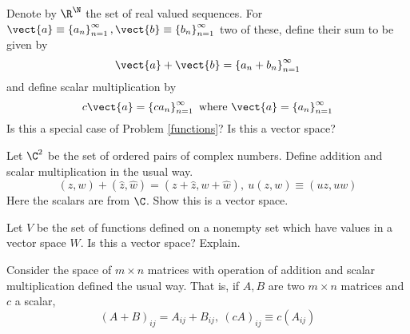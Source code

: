 \begin{enumialphparenastyle}
\begin{ex} Denote by $\R^{\N}$ the set of real valued sequences.
For $\vect{a}\equiv \left\{ a_{n}\right\} _{n=1}^{\infty },\vect{b}\equiv
\left\{ b_{n}\right\} _{n=1}^{\infty }$ two of these, define their sum to be
given by 
\begin{equation*}
\vect{a}+\vect{b} =  \left\{ a_{n}+b_{n}\right\} _{n=1}^{\infty }
\end{equation*}
and define scalar multiplication by 
\begin{equation*}
c\vect{a}=\left\{ ca_{n}\right\} _{n=1}^{\infty }\text{ where }\vect{a}
=\left\{ a_{n}\right\} _{n=1}^{\infty }
\end{equation*}
Is this a special case of Problem \ref{functions}? Is this a vector space?
\end{ex}

\begin{ex} Let $\C^{2}$ be the set of ordered pairs of complex numbers.
Define addition and scalar multiplication in the usual way.
\begin{equation*}
\left( z,w\right) +\left( \hat{z},\hat{w}\right) = \left( z+\hat{z},w+
\hat{w}\right) ,\ u\left( z,w\right) \equiv \left( uz,uw\right)
\end{equation*}
Here the scalars are from $\C$. Show this is a vector space.
\end{ex}

\begin{ex} Let $V$ be the set of functions defined on a nonempty set which have
values in a vector space $W.$ Is this a vector space? Explain.
\end{ex}

\begin{ex} Consider the space of $m\times n$ matrices with operation of addition
and scalar multiplication defined the usual way. That is, if $A,B$ are two $
m\times n$ matrices and $c$ a scalar, 
\begin{equation*}
\left( A+B\right) _{ij}=A_{ij}+B_{ij},\ \left( cA\right) _{ij}\equiv c\left(
A_{ij}\right)
\end{equation*}
\end{ex}


\end{enumialphparenastyle}
